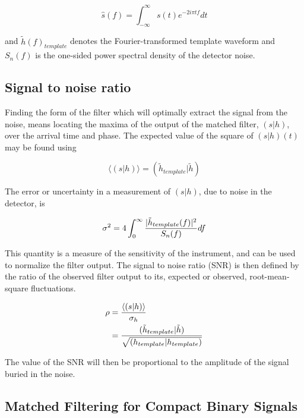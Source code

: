 \documentclass[binding=0.6cm, LaM]{sapthesis}
\begin{document}
		\begin{equation}
			\hat s(f) = \int^{\infty}_{-\infty} s(t) e^{-2i \pi tf} dt
		\end{equation}

	and $\tilde h(f)_{template}$ denotes the Fourier-transformed template waveform 
	and $S_n(f)$ is the one-sided power spectral density of the detector noise. 
  
\subsection{Signal to noise ratio}

	Finding the form of the filter which will optimally extract the signal from the noise, 
	means locating the maxima of the output of the matched filter, $(s|h)$, over the arrival time and phase.
	The expected value of the square of $(s|h)(t)$ may be found using 

		\begin{equation}
			\langle (s|h) \rangle = (\tilde h_{template}|\tilde h)
		\end{equation}

	The error or uncertainty in a measurement of $(s|h)$, due to noise in the detector, is 

                \begin{equation}
                        \sigma^2 =4 \int^{\infty}_{0} {{|\tilde h_{template}(f)|^2} \over {S_n(f)}}df
                \end{equation}

	This quantity is a measure of the sensitivity of the instrument, 
	and can be used to normalize the filter output. 
	The signal to noise ratio (SNR) is then defined by the ratio of the observed filter output to its, 
	expected or observed, root-mean-square fluctuations.

		\begin{align}
			\rho &= {{\langle (s|h) \rangle} \over {\sigma_{h}}} \\
	    		     &= {{(\tilde h_{template}|\tilde h)} \over {\sqrt{(h_{template}|h_{template})}}}
		\end{align}

	The value of the SNR will then be proportional to the amplitude of the signal buried in the noise. 

\subsection{Matched Filtering for Compact Binary Signals}
\end{document}
